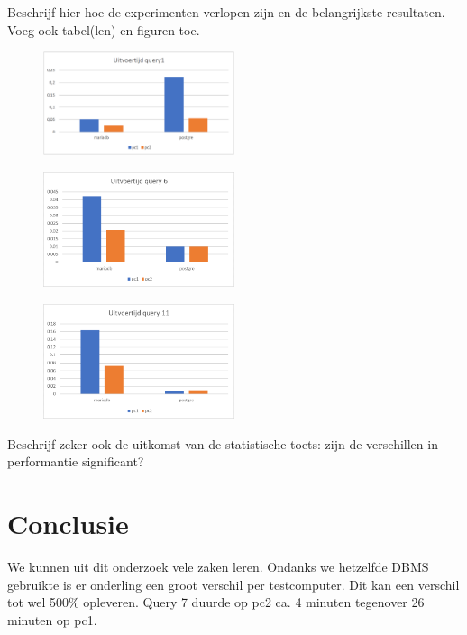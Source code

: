 \documentclass[fleqn,10pt]{artikeltin}
\begin{document}
Beschrijf hier hoe de experimenten verlopen zijn en de belangrijkste resultaten. Voeg ook tabel(len) en figuren toe.

\begin{figure}
    \includegraphics[width=0.5\textwidth]{query1.png}
\end{figure}

\begin{figure}
    \includegraphics[width=0.5\textwidth]{query6Graph.png}
\end{figure}

\begin{figure}
    \includegraphics[width=0.5\textwidth]{query11Graph.png}
\end{figure}

Beschrijf zeker ook de uitkomst van de statistische toets: zijn de verschillen in performantie significant?

\section{Conclusie}
\label{sec:conclusie}

We kunnen uit dit onderzoek vele zaken leren. Ondanks we hetzelfde DBMS gebruikte is er onderling een groot verschil per testcomputer. Dit kan een verschil tot wel 500\% opleveren. Query 7 duurde op pc2 ca. 4 minuten tegenover 26 minuten op pc1.
\end{document}
